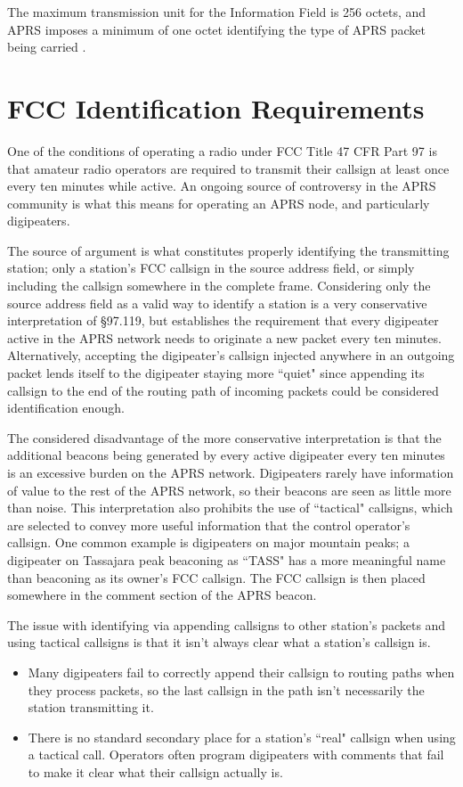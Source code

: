 The maximum transmission unit for the Information Field is 256 octets, and APRS imposes
a minimum of one octet identifying the type of APRS packet being carried \cite{aprsspec}.

\section{FCC Identification Requirements}

One of the conditions of operating a radio under FCC Title 47 CFR Part 97 is that amateur radio 
operators are required to transmit their callsign at least once every ten minutes while active.
An ongoing source of controversy in the APRS community is what this means for operating
an APRS node, and particularly digipeaters.

The source of argument is what constitutes properly identifying the
transmitting station; only a station's FCC callsign in the source address field,
or simply including the callsign somewhere in the complete frame.
Considering only the source address field as a valid way to identify a station is
a very conservative interpretation of \S97.119, but establishes the requirement that every 
digipeater active in the APRS network needs to originate a new packet every ten minutes.
Alternatively, accepting the digipeater's callsign injected anywhere in an outgoing 
packet lends itself to the digipeater staying more ``quiet" since appending its callsign
to the end of the routing path of incoming packets could be considered identification enough.

The considered disadvantage of the more conservative interpretation is that the additional
beacons being generated by every active digipeater every ten minutes is an
excessive burden on the APRS network. Digipeaters rarely have information of value
to the rest of the APRS network, so their beacons are seen as little more than noise.
This interpretation also prohibits the use of ``tactical" callsigns, which are selected
to convey more useful information that the control operator's callsign.
One common example is digipeaters on major mountain peaks; a digipeater 
on Tassajara peak beaconing as ``TASS" has a more meaningful name than beaconing as
its owner's FCC callsign. The FCC callsign is then placed somewhere in the comment section
of the APRS beacon.

The issue with identifying via appending callsigns to other station's packets and
using tactical callsigns is that it isn't always clear what a station's callsign is.
\begin{itemize}
	\item Many digipeaters fail to correctly append their callsign to routing paths when
		they process packets, so the last callsign in the path isn't necessarily the 
		station transmitting it.
	\item There is no standard secondary place for a station's ``real" callsign 
		when using a tactical call.
		Operators often program digipeaters with comments that fail to make it clear
		what their callsign actually is.
\end{itemize}

